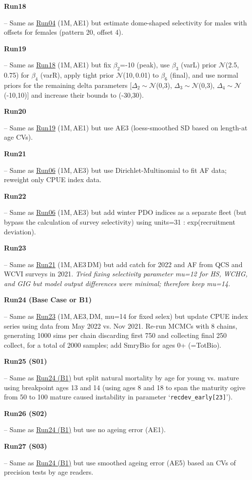 \hypertarget{R18}{\textbf{Run18}} -- Same as \hyperlink{R04}{Run04} (1M,\,AE1) but estimate dome-shaped selectivity for males with offsets for females (pattern 20, offset 4).

\hypertarget{R19}{\textbf{Run19}} -- Same as \hyperlink{R18}{Run18} (1M,\,AE1) but fix $\beta_2$=-10 (peak), use $\beta_3$ (varL) prior $\mathcal{N}$(2.5,\,0.75) for $\beta_4$ (varR), apply tight prior $\mathcal{N}$(10,\,0.01) to $\beta_6$ (final), and use normal priors for the remaining delta parameters [$\Delta_2\sim\mathcal{N}$(0,3), $\Delta_3\sim\mathcal{N}$(0,3), $\Delta_4\sim\mathcal{N}$(-10,10)] and increase their bounds to (-30,30).

\hypertarget{R20}{\textbf{Run20}} -- Same as \hyperlink{R19}{Run19} (1M,\,AE1) but use AE3 (loess-smoothed SD based on length-at age CVs).

\hypertarget{R21}{\textbf{Run21}} -- Same as \hyperlink{R06}{Run06} (1M,\,AE3) but use Dirichlet-Multinomial to fit AF data; reweight only CPUE index data.

\hypertarget{R22}{\textbf{Run22}} -- Same as \hyperlink{R06}{Run06} (1M,\,AE3) but add winter PDO indices as a separate fleet (but bypass the calculation of survey selectivity) using units=31 : exp(recruitment deviation).

\hypertarget{R23}{\textbf{Run23}} -- Same as \hyperlink{R21}{Run21} (1M,\,AE3\,DM) but add catch for 2022 and AF from QCS and WCVI surveys in 2021. \emph{Tried fixing selectivity parameter mu=12 for HS, WCHG, and GIG but model output differences were minimal; therefore keep mu=14.}

\hypertarget{R24}{\textbf{Run24 (Base Case or B1)}} -- Same as \hyperlink{R23}{Run23} (1M,\,AE3,\,DM, mu=14 for fixed selex) but update CPUE index series using data from May 2022 vs. Nov 2021. Re-run MCMCs with 8 chains, generating 1000 sims per chain discarding first 750 and collecting final 250 collect, for a total of 2000 samples; add SmryBio for ages 0+ (=TotBio).

\hypertarget{R25}{\textbf{Run25 (S01)}} -- Same as \hyperlink{R24}{Run24 (B1)} but split natural mortality by age for young vs. mature using breakpoint ages 13 and 14 (using ages 8 and 18 to span the maturity ogive from 50\pc{} to 100\pc{} mature caused instability in parameter `\texttt{recdev\_early[23]}').

\hypertarget{R26}{\textbf{Run26 (S02)}} -- Same as \hyperlink{R24}{Run24 (B1)} but use no ageing error (AE1).

\hypertarget{R27}{\textbf{Run27 (S03)}} -- Same as \hyperlink{R24}{Run24 (B1)} but use smoothed ageing error (AE5) based an CVs of precision tests by age readers.

